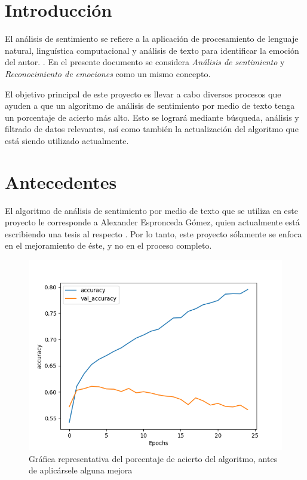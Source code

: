 \documentclass[a4]{sciposter}
\begin{document}
\begin{multicols}{3} 

\section{Introducción}
El análisis de sentimiento se refiere a la aplicación de procesamiento de lenguaje natural, linguística computacional y análisis de texto para identificar la emoción del autor. \citep{definition}. En el presente documento se considera \textit{Análisis de sentimiento} y \textit{Reconocimiento de emociones} como un mismo concepto.

El objetivo principal de este proyecto es llevar a cabo diversos procesos que ayuden a que un algoritmo de análisis de sentimiento por medio de texto tenga un porcentaje de acierto más alto. Esto se logrará mediante búsqueda, análisis y filtrado de datos relevantes, así como también la actualización del algoritmo que está siendo utilizado actualmente.

\section{Antecedentes}

El algoritmo de análisis de sentimiento por medio de texto que se utiliza en este proyecto le corresponde a Alexander Espronceda Gómez, quien actualmente está escribiendo una tesis al respecto \citep{chatbot}. Por lo tanto, este proyecto sólamente se enfoca en el mejoramiento de éste, y no en el proceso completo.
\begin{figure}
	\centering
	\captionsetup{type=figure}
	\setcounter{figure}{0}
	\includegraphics[scale=1.3]{img/Accuracy 2020-05_nofilter}
	\caption{Gráfica representativa del porcentaje de acierto del algoritmo, antes de aplicársele alguna mejora}
	

\end{figure}
\end{multicols}
\end{document}
